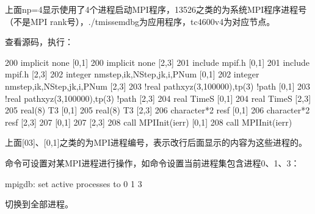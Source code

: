 \documentclass[a4paper,12pt,english]{sphinxmanual}
\begin{document}
\begin{sphinxVerbatim}[commandchars=\\\{\}]
   
     
     
     
     
\end{sphinxVerbatim}

\sphinxAtStartPar
上面np=4显示使用了4个进程启动MPI程序，13526之类的为系统MPI程序进程号（不是MPI rank号），./tmissem\sphinxhyphen{}dbg为应用程序，tc4600v4为对应节点。

\sphinxAtStartPar
查看源码，执行：

\begin{sphinxVerbatim}[commandchars=\\\{\}]
[2,3]   200 implicit none
[0,1]   200 implicit none
[2,3]   201 include \PYGZsq{}mpif.h\PYGZsq{}
[0,1]   201 include \PYGZsq{}mpif.h\PYGZsq{}
[2,3]   202 integer nmstep,ik,NStep,jk,i,PNum
[0,1]   202 integer nmstep,ik,NStep,jk,i,PNum
[2,3]   203 !real pathxyz(3,100000),t\PYGZus{}p(3) !path
[0,1]   203 !real pathxyz(3,100000),t\PYGZus{}p(3) !path
[2,3]   204 real    Time\PYGZus{}S
[0,1]   204 real    Time\PYGZus{}S
[2,3]   205 real(8)  T3
[0,1]   205 real(8)  T3
[2,3]   206 character*2 resf
[0,1]   206 character*2 resf
[2,3]   207
[0,1]   207
[2,3]   208 call MPI\PYGZus{}Init(ierr)
[0,1]   208 call MPI\PYGZus{}Init(ierr)
\end{sphinxVerbatim}

\sphinxAtStartPar
上面{[}0\sphinxhyphen{}3{]}、{[}0,1{]}之类的为MPI进程编号，表示改行后面显示的内容为这些进程的。

\sphinxAtStartPar
{}命令可设置对某MPI进程进行操作，如命令设置当前进程集包含进程0、1、3：

\sphinxAtStartPar
mpigdb: set active processes to 0 1 3

\sphinxAtStartPar
{}切换到全部进程。
\end{document}
